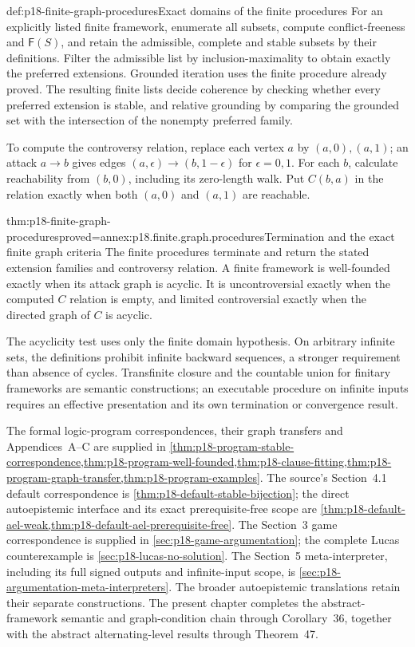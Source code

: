 \begin{hbmethod}{def:p18-finite-graph-procedures}{Exact domains of the finite procedures}
For an explicitly listed finite framework, enumerate
all subsets, compute conflict-freeness and
\(\mathsf F(S)\), and retain the admissible,
complete and stable subsets by their definitions.
Filter the admissible list by inclusion-maximality
to obtain exactly the preferred extensions.
Grounded iteration uses the finite procedure
already proved.
The resulting finite lists decide coherence
by checking whether every preferred extension
is stable, and relative grounding by comparing
the grounded set with the intersection of
the nonempty preferred family.

To compute the controversy relation, replace
each vertex \(a\) by \((a,0),(a,1)\);
an attack \(a\to b\) gives edges
\((a,\epsilon)\to(b,1-\epsilon)\) for
\(\epsilon=0,1\). For each \(b\), calculate
reachability from \((b,0)\), including its
zero-length walk. Put \(C(b,a)\) in the
relation exactly when both \((a,0)\)
and \((a,1)\) are reachable.
\end{hbmethod}

\begin{hbtheorem}{thm:p18-finite-graph-procedures}{proved=annex:p18.finite.graph.procedures}{Termination and the exact finite graph criteria}
The finite procedures terminate and return the
stated extension families and controversy relation.
A finite framework is well-founded exactly
when its attack graph is acyclic. It is
uncontroversial exactly when the computed
\(C\) relation is empty, and limited
controversial exactly when the directed graph
of \(C\) is acyclic.

The acyclicity test uses only the finite
domain hypothesis. On arbitrary infinite
sets, the definitions prohibit infinite
backward sequences, a stronger requirement
than absence of cycles. Transfinite closure
and the countable union for finitary
frameworks are semantic constructions;
an executable procedure on infinite inputs
requires an effective presentation and
its own termination or convergence result.
\end{hbtheorem}

The formal logic-program correspondences, their graph transfers and
Appendices~A--C are supplied in
\cref{thm:p18-program-stable-correspondence,thm:p18-program-well-founded,thm:p18-clause-fitting,thm:p18-program-graph-transfer,thm:p18-program-examples}. The source's Section~4.1 default correspondence
is \cref{thm:p18-default-stable-bijection}; the direct autoepistemic
interface and its exact prerequisite-free scope are
\cref{thm:p18-default-ael-weak,thm:p18-default-ael-prerequisite-free}.
The Section~3 game correspondence is supplied in
\cref{sec:p18-game-argumentation}; the complete Lucas counterexample
is \cref{sec:p18-lucas-no-solution}. The Section~5 meta-interpreter,
including its full signed outputs and infinite-input scope, is
\cref{sec:p18-argumentation-meta-interpreters}.
The broader autoepistemic translations retain their separate
constructions. The present
chapter completes the abstract-framework
semantic and graph-condition chain through
Corollary~36, together with the abstract
alternating-level results through Theorem~47.
